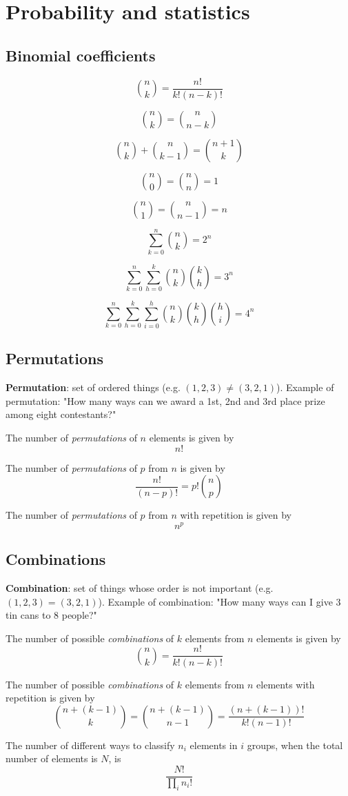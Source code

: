\chapter{Probability and statistics}

\section{Binomial coefficients}
\begin{multicols}{3}
	
	\[ \binom{n}{k} = \frac{n!}{k!(n-k)!} \]
	
	\[ \binom{n}{k} = \binom{n}{n-k} \]
	
	\[ \binom{n}{k} + \binom{n}{k-1} = \binom{n+1}{k} \]
	
	\[ \binom{n}{0} = \binom{n}{n} = 1 \]
	
	\[ \binom{n}{1} = \binom{n}{n-1} = n \]
	
	\[ \sum_{k=0}^{n}\binom{n}{k} = 2^n \]
	
	\[ \sum_{k=0}^{n}\sum_{h=0}^{k}\binom{n}{k}\binom{k}{h} = 3^n \]
	
	\[ \sum_{k=0}^{n}\sum_{h=0}^{k}\sum_{i=0}^{h}\binom{n}{k}\binom{k}{h}\binom{h}{i} = 4^n \]
	
\end{multicols}

\section{Permutations}
\textbf{Permutation}: set of ordered things (e.g. $(1,2,3)\ne(3,2,1)$).
Example of permutation: "How many ways can we award a 1st, 2nd and 3rd place prize among eight contestants?"

The number of {\it permutations} of $n$ elements is given by $$n!$$

The number of {\it permutations} of $p$ from $n$ is given by
\[
\frac{n!}{(n-p)!}=p!{n\choose p}
\]

The number of {\it permutations} of $p$ from $n$ with repetition is given by
\[
n^p
\]

\section{Combinations}
\textbf{Combination}: set of things whose order is not important (e.g. $(1,2,3)=(3,2,1)$).
Example of combination: "How many ways can I give 3 tin cans to 8 people?"

The number of possible {\it combinations} of $k$ elements from $n$ elements is given by
\[
{n\choose k}=\frac{n!}{k!(n-k)!}
\]

The number of possible {\it combinations} of $k$ elements from $n$ elements with repetition is given by
\[
{n+(k-1)\choose k}={n+(k-1)\choose n-1}=\frac{(n+(k-1))!}{k!(n-1)!}
\]

The number of different ways to classify $n_i$ elements in $i$ groups, when
the total number of elements is $N$, is
\[
\frac{N!}{\prod\limits_i n_i!}
\]
